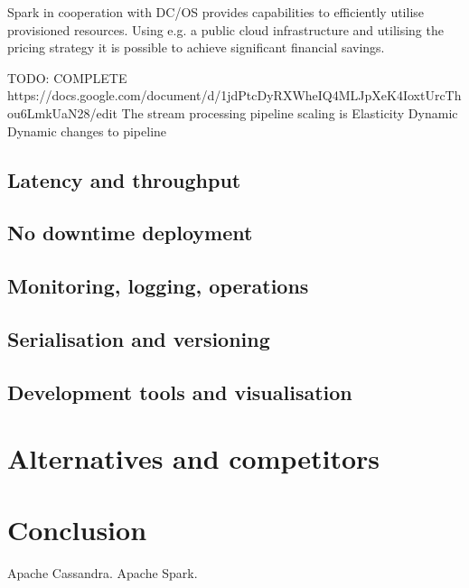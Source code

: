 \documentclass[a4paper, 10 pt, conference]{IEEEtran}
\begin{document}
Spark in cooperation with DC/OS provides capabilities to efficiently utilise provisioned resources. Using e.g. a public cloud infrastructure and utilising the pricing strategy it is possible to achieve significant financial savings.
 
 
TODO: COMPLETE https://docs.google.com/document/d/1jdPtcDyRXWheIQ4MLJpXeK4IoxtUrcThou6LmkUaN28/edit
The stream processing pipeline scaling is 
Elasticity
Dynamic
Dynamic changes to pipeline

\subsection{Latency and throughput}
\subsection{No downtime deployment}
\subsection{Monitoring, logging, operations}
\subsection{Serialisation and versioning}
\subsection{Development tools and visualisation}

\section{Alternatives and competitors}

\section{Conclusion}


\addtolength{\textheight}{-12cm}  %

\begin{thebibliography}{99}
 Apache Cassandra.
 Apache Spark.
\end{thebibliography}
\end{document}
